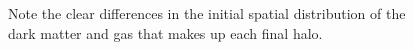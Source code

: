 \begin{figure}
{  %
  Note the clear differences in the initial spatial distribution of the dark matter and gas that makes up each final halo.
  }
	\vspace{1cm}
	\label{fig:bigtransferpic}
\end{figure}


